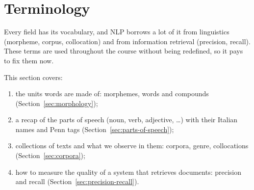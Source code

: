 \section{Terminology}
\label{sec:terminology}

Every field has its vocabulary, and NLP borrows a lot of it from linguistics (morpheme,
corpus, collocation) and from information retrieval (precision, recall). These terms
are used throughout the course without being redefined, so it pays to fix them now.

This section covers:
\begin{enumerate}[nosep]
  \item the units words are made of: morphemes, words and compounds
        (Section~\ref{sec:morphology});
  \item a recap of the parts of speech (noun, verb, adjective, \ldots) with their Italian
        names and Penn tags (Section~\ref{sec:parts-of-speech});
  \item collections of texts and what we observe in them: corpora, genre, collocations
        (Section~\ref{sec:corpora});
  \item how to measure the quality of a system that retrieves documents: precision and
        recall (Section~\ref{sec:precision-recall}).
\end{enumerate}





